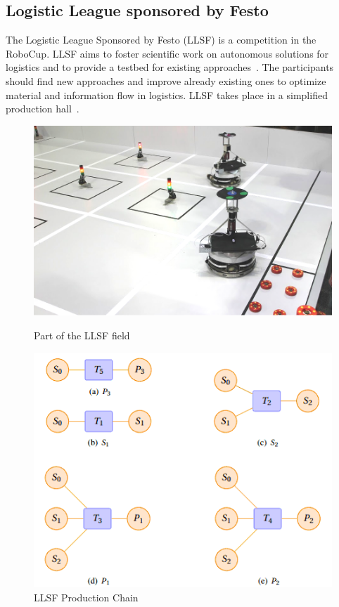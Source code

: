 \subsection{Logistic League sponsored by Festo}
The Logistic League Sponsored by Festo (LLSF) is a competition in the RoboCup. LLSF aims to foster scientific work on autonomous solutions for logistics and to provide a testbed for existing approaches~\cite{LLSFTestbed}. The participants should find new approaches and improve already existing ones to optimize material and information flow in logistics.
LLSF takes place  in a simplified production hall~\cite{LLSFRules}.
\begin{figure}
\begin{minipage}[b]{0.5\linewidth}
\includegraphics[scale=0.23]{pics/llsf}
\caption{Part of the LLSF field}
\label{fig:llsf_field}
\end{minipage}
\quad
\begin{minipage}[b]{0.5\linewidth}
\includegraphics[scale=0.45]{pics/production_chain}
\caption{LLSF Production Chain}
\label{fig:llsf_chain}
\end{minipage}
\end{figure}
